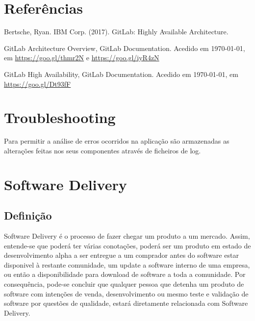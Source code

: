 \documentclass[12pt,a4paper]{article}
\begin{document}
\newpage
\section{Referências}

\vspace{1.3cm}
Bertsche, Ryan. IBM Corp. (2017). GitLab: Highly Available Architecture.

\bigbreak
GitLab Architecture Overview, GitLab Documentation. Acedido em \today, em \url{https://goo.gl/thmr2N} e \url{https://goo.gl/iyR4zN} 

\bigbreak
GitLab High Availability, GitLab Documentation. Acedido em \today, em \url{https://goo.gl/Dt93fF}










\iffalse
\newpage
\section{Troubleshooting}

Para permitir a análise de erros ocorridos na aplicação são armazenadas as alterações feitas nos seus componentes através de ficheiros de log.
\newpage

\section{Software Delivery}
\subsection{Definição}
Software Delivery é o processo de fazer chegar um produto a um mercado. Assim, entende-se que poderá ter várias conotações, poderá ser um produto em estado de desenvolvimento alpha a ser entregue a um comprador antes do software estar disponivel à restante comunidade, um update a software interno de uma empresa, ou então a disponibilidade para download de software a toda a comunidade.
Por consequência, pode-se concluir que qualquer pessoa que detenha um produto de software com intenções de venda, desenvolvimento ou mesmo teste e validação de software por questões de qualidade, estará diretamente relacionada com Software Delivery.
\end{document}
